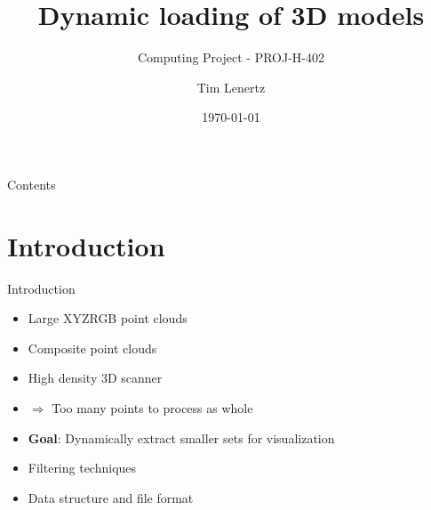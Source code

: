 \documentclass{beamer}
\title{Dynamic loading of 3D models}
\subtitle{Computing Project - PROJ-H-402}
\author{Tim Lenertz}
\institute{ULB, MA1 INFO}
\date{\today}
\begin{document}
\begin{frame}
	\titlepage
\end{frame}

\begin{frame}{Contents}
	\tableofcontents
\end{frame}

\section{Introduction}

\begin{frame}{Introduction}
	\begin{itemize}
	\item Large XYZRGB point clouds
	\item Composite point clouds
	\item High density 3D scanner
	\item $\Rightarrow$ Too many points to process as whole
	\item \textbf{Goal}: Dynamically extract smaller sets for visualization
	\item Filtering techniques
	\item Data structure and file format
	\end{itemize}
\end{frame}
\end{document}
